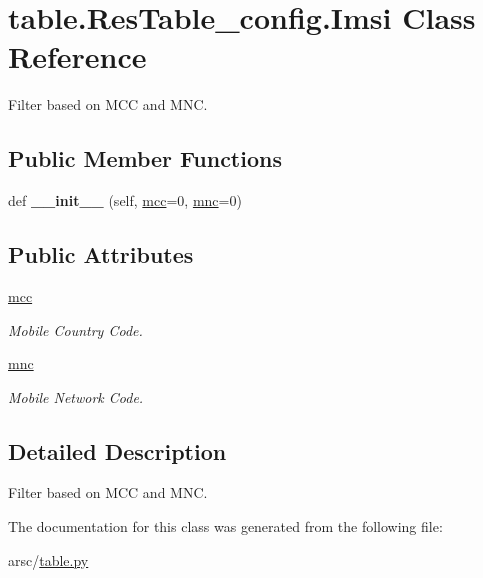 \hypertarget{classtable_1_1ResTable__config_1_1Imsi}{}\section{table.\+Res\+Table\+\_\+config.\+Imsi Class Reference}
\label{classtable_1_1ResTable__config_1_1Imsi}


Filter based on M\+CC and M\+NC.  


\subsection*{Public Member Functions}
\begin{DoxyCompactItemize}
\item 
\mbox{\label{classtable_1_1ResTable__config_1_1Imsi_a3e4b10bad3cfc7a2e672bf5cd4400680}} 
def {\bfseries \+\_\+\+\_\+init\+\_\+\+\_\+} (self, \mbox{\hyperlink{classtable_1_1ResTable__config_1_1Imsi_ad7dacfb18794438ecc38d2d15223ad4d}{mcc}}=0, \mbox{\hyperlink{classtable_1_1ResTable__config_1_1Imsi_a85d652a94270b62c5d9280d76f0bf8c1}{mnc}}=0)
\end{DoxyCompactItemize}
\subsection*{Public Attributes}
\begin{DoxyCompactItemize}
\item 
\mbox{\label{classtable_1_1ResTable__config_1_1Imsi_ad7dacfb18794438ecc38d2d15223ad4d}} 
\mbox{\hyperlink{classtable_1_1ResTable__config_1_1Imsi_ad7dacfb18794438ecc38d2d15223ad4d}{mcc}}
\begin{DoxyCompactList}\small\item\em Mobile Country Code. \end{DoxyCompactList}\item 
\mbox{\label{classtable_1_1ResTable__config_1_1Imsi_a85d652a94270b62c5d9280d76f0bf8c1}} 
\mbox{\hyperlink{classtable_1_1ResTable__config_1_1Imsi_a85d652a94270b62c5d9280d76f0bf8c1}{mnc}}
\begin{DoxyCompactList}\small\item\em Mobile Network Code. \end{DoxyCompactList}\end{DoxyCompactItemize}


\subsection{Detailed Description}
Filter based on M\+CC and M\+NC. 

The documentation for this class was generated from the following file\+:\begin{DoxyCompactItemize}
\item 
arsc/\mbox{\hyperlink{table_8py}{table.\+py}}\end{DoxyCompactItemize}

